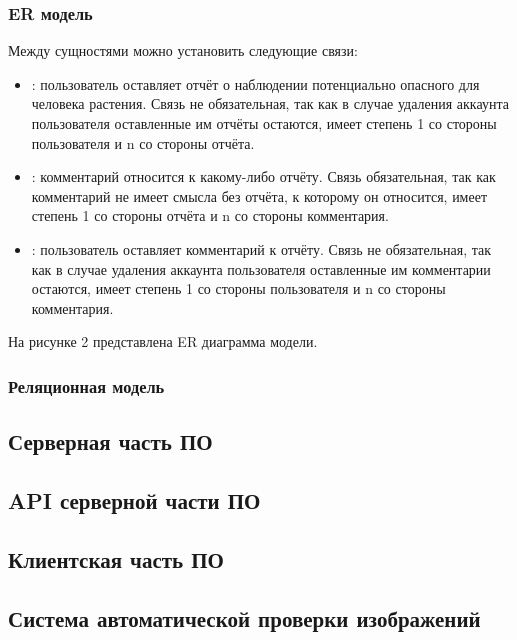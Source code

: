 \subsubsection{ER модель}

\tab
Между сущностями можно установить следующие связи:
\begin{itemize}[topsep=0pt, parsep=0pt, itemsep=0pt, leftmargin=*, labelindent=0.5cm]
	\item {}: пользователь оставляет отчёт о наблюдении потенциально опасного для человека растения. Связь не обязательная, так как в случае удаления аккаунта пользователя оставленные им отчёты остаются, имеет степень 1 со стороны пользователя и n со стороны отчёта.
	\item {}: комментарий относится к какому-либо отчёту. Связь обязательная, так как комментарий не имеет смысла без отчёта, к которому он относится, имеет степень 1 со стороны отчёта и n со стороны комментария.
	\item {}: пользователь оставляет комментарий к отчёту. Связь не обязательная, так как в случае удаления аккаунта пользователя оставленные им комментарии остаются, имеет степень 1 со стороны пользователя и n со стороны комментария.
\end{itemize}

\tab
На рисунке 2 представлена ER диаграмма модели. \\
\picturetwo

\subsubsection{Реляционная модель}



\subsection{Серверная часть ПО}

\subsection{API серверной части ПО}

\subsection{Клиентская часть ПО}

\subsection{Система автоматической проверки изображений}

